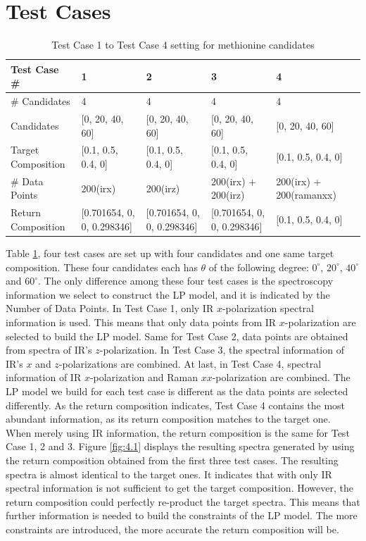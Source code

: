\section{Test Cases}
\begin{table}\tiny 
\begin{tabular}{| l | l | l | l | l | l }
\hline
Test Case \# & 1 & 2 & 3 & 4 \\
\hline
\# Candidates & 4 & 4 & 4 & 4 \\
\hline
Candidates & [0, 20, 40, 60] & [0, 20, 40, 60] & [0, 20, 40, 60] & [0, 20, 40, 60]\\
\hline
Target Composition & [0.1, 0.5, 0.4, 0] & [0.1, 0.5, 0.4, 0] & [0.1, 0.5, 0.4, 0] & [0.1, 0.5, 0.4, 0]\\
\hline
\# Data Points & 200(irx) & 200(irz) & 200(irx) + 200(irz) & 200(irx) + 200(ramanxx)\\
\hline
Return Composition & [0.701654, 0, 0, 0.298346] & [0.701654, 0, 0, 0.298346] & [0.701654, 0, 0, 0.298346] & [0.1, 0.5, 0.4, 0]\\
\hline
\end{tabular} 
\caption{Test Case 1 to Test Case 4 setting for methionine candidates} 
\label{tab:4.1}
\end{table}	

Table \ref{tab:4.1}, four test cases are set up with four candidates and one same target composition. These four candidates each has $\theta$ of the following degree: $0^{\circ}$, $20^{\circ}$, $40^{\circ}$ and $60^{\circ}$. The only difference among these four test cases is the spectroscopy information we select to construct the LP model, and it is indicated by the Number of Data Points. In Test Case 1, only IR $x$-polarization spectral information is used. This means that only data points from IR $x$-polarization are selected to build the LP model. Same for Test Case 2, data points are obtained from spectra of IR's $z$-polarization. In Test Case 3, the spectral information of IR's $x$ and $z$-polarizations are combined. At last, in Test Case 4, spectral information of IR $x$-polarization and Raman $xx$-polarization are combined. The LP model we build for each test case is different as the data points are selected differently. As the return composition indicates, 
Test Case 4 contains the most abundant information, as its return composition matches to the target one. \\

When merely using IR information, the return composition is the same for Test Case 1, 2 and 3. Figure \ref{fig:4.1} displays the resulting spectra generated by using the return composition obtained from the first three test cases. The resulting spectra is almost identical to the target ones. It indicates that with only IR spectral information is not sufficient to get the target composition.  However, the return composition could perfectly re-product the target spectra. This means that further information is needed to build the constraints of the LP model. The more constraints are introduced, the more accurate the return composition will be. \\

